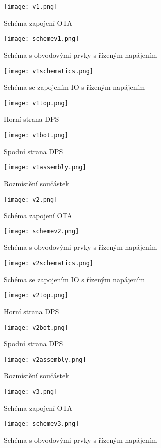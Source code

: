 \begin{figure}[h]
\centering
\texttt{[image: v1.png]}
\caption{Schéma zapojení OTA}
\end{figure}
\begin{figure}[h]
\centering
\texttt{[image: schemev1.png]}
\caption{Schéma s obvodovými prvky s řízeným napájením}
\end{figure}
\begin{figure}[h]
\centering
\texttt{[image: v1schematics.png]}
\caption{Schéma se zapojením IO s řízeným napájením}
\end{figure}
\begin{figure}[h]
\centering
\texttt{[image: v1top.png]}
\caption{Horní strana DPS}
\end{figure}
\begin{figure}[h]
\centering
\texttt{[image: v1bot.png]}
\caption{Spodní strana DPS}
\end{figure}
\begin{figure}[h]
\centering
\texttt{[image: v1assembly.png]}
\caption{Rozmístění součástek}
\end{figure}
\begin{figure}[h]
\centering
\texttt{[image: v2.png]}
\caption{Schéma zapojení OTA}
\end{figure}
\begin{figure}[h]
\centering
\texttt{[image: schemev2.png]}
\caption{Schéma s obvodovými prvky s řízeným napájením}
\end{figure}
\begin{figure}[h]
\centering
\texttt{[image: v2schematics.png]}
\caption{Schéma se zapojením IO s řízeným napájením}
\end{figure}
\begin{figure}[h]
\centering
\texttt{[image: v2top.png]}
\caption{Horní strana DPS}
\end{figure}
\begin{figure}[h]
\centering
\texttt{[image: v2bot.png]}
\caption{Spodní strana DPS}
\end{figure}
\begin{figure}[h]
\centering
\texttt{[image: v2assembly.png]}
\caption{Rozmístění součástek}
\end{figure}
\begin{figure}[h]
\centering
\texttt{[image: v3.png]}
\caption{Schéma zapojení OTA}
\end{figure}
\begin{figure}[h]
\centering
\texttt{[image: schemev3.png]}
\caption{Schéma s obvodovými prvky s řízeným napájením}
\end{figure}
